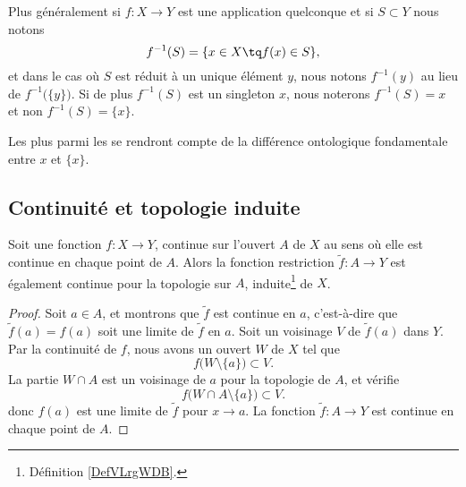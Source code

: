 Plus généralement si \( f\colon X\to Y\) est une application quelconque et si \( S\subset Y\) nous notons
\begin{equation}
	f^{-1}(S)=\{ x\in X\tq f(x)\in S \},
\end{equation}
et dans le cas où \( S\) est réduit à un unique élément \( y\), nous notons \( f^{-1}(y)\) au lieu de \( f^{-1}\big( \{ y \} \big)\). Si de plus \( f^{-1}(S)\) est un singleton \( x\), nous noterons \( f^{-1}(S)=x\) et non \( f^{-1}(S)=\{ x \}\).

Les plus  parmi les  se rendront compte de la différence ontologique fondamentale entre \( x\) et \( \{ x \}\).


\subsection{Continuité et topologie induite}
\begin{proposition}     \label{PROPooNPLBooPfmmym}
	Soit une fonction \( f\colon X\to Y\), continue sur l'ouvert \( A\) de \( X\) au sens où elle est continue en chaque point de \( A\). Alors la fonction restriction \( \tilde f\colon A\to Y\) est également continue pour la topologie sur \( A\), induite\footnote{Définition \ref{DefVLrgWDB}.} de \( X\).
\end{proposition}

\begin{proof}
	Soit \( a\in A\), et montrons que \( \tilde f\) est continue en \( a\), c'est-à-dire que \( \tilde f(a)=f(a)\) soit une limite de \( \tilde f\) en \( a\). Soit un voisinage \( V\) de \( \tilde f(a)\) dans \( Y\). Par la continuité de \( f\), nous avons un ouvert \( W\) de \( X\) tel que
	\begin{equation}
		f\big( W\setminus\{ a \} \big)\subset V.
	\end{equation}
	La partie \( W\cap A\) est un voisinage de \( a\) pour la topologie de \( A\), et vérifie
	\begin{equation}
		f\big( W\cap A\setminus\{ a \} \big)\subset V.
	\end{equation}
	donc \( f(a)\) est une limite de \( \tilde f\) pour \( x\to a\). La fonction \( \tilde f\colon A\to Y\) est continue en chaque point de \( A\).
\end{proof}

